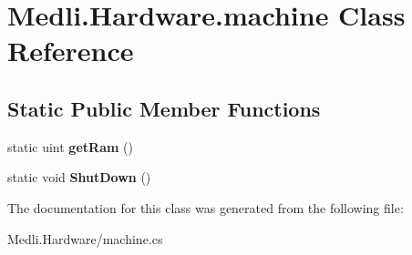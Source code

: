 \hypertarget{class_medli_1_1_hardware_1_1machine}{}\section{Medli.\+Hardware.\+machine Class Reference}
\label{class_medli_1_1_hardware_1_1machine}
\subsection*{Static Public Member Functions}
\begin{DoxyCompactItemize}
\item 
\mbox{\label{class_medli_1_1_hardware_1_1machine_a741a5aa67ac1a686725c39c7cf09e60f}} 
static uint {\bfseries get\+Ram} ()
\item 
\mbox{\label{class_medli_1_1_hardware_1_1machine_a5ed4d74729e613eaeddb3d01b6d34cf1}} 
static void {\bfseries Shut\+Down} ()
\end{DoxyCompactItemize}


The documentation for this class was generated from the following file\+:\begin{DoxyCompactItemize}
\item 
Medli.\+Hardware/machine.\+cs\end{DoxyCompactItemize}
